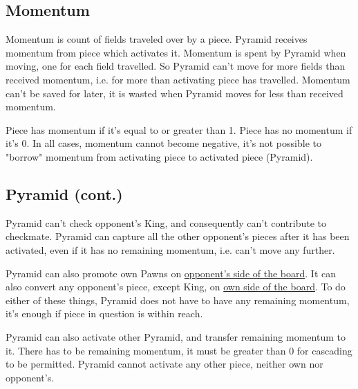 \subsection*{Momentum}
\label{sec:Mayan Ascendancy/Pyramid/Momentum}

Momentum is count of fields traveled over by a piece. Pyramid receives
momentum from piece which activates it. Momentum is spent by Pyramid when
moving, one for each field travelled. So Pyramid can't move for more
fields than received momentum, i.e. for more than activating piece has
travelled. Momentum can't be saved for later, it is wasted when Pyramid
moves for less than received momentum.

Piece has momentum if it's equal to or greater than 1. Piece has no momentum
if it's 0. In all cases, momentum cannot become negative, it's not possible
to "borrow" momentum from activating piece to activated piece (Pyramid).

\clearpage %

\subsection*{Pyramid (cont.)}
\label{sec:Mayan Ascendancy/Pyramid/Pyramid (cont.)}

Pyramid can't check opponent's King, and consequently can't contribute to
checkmate. Pyramid can capture all the other opponent's pieces after it has
been activated, even if it has no remaining momentum, i.e. can't move any
further.

Pyramid can also promote own Pawns on
\hyperref[sec:Definitions/Chessboard sides, navigation]{opponent's side of the board}.
It can also convert any opponent's piece, except King, on
\hyperref[sec:Definitions/Chessboard sides, navigation]{own side of the board}.
To do either of these things, Pyramid does not have to have any remaining
momentum, it's enough if piece in question is within reach.

Pyramid can also activate other Pyramid, and transfer remaining momentum to it.
There has to be remaining momentum, it must be greater than 0 for cascading
to be permitted. Pyramid cannot activate any other piece, neither own nor
opponent's.

\clearpage %

